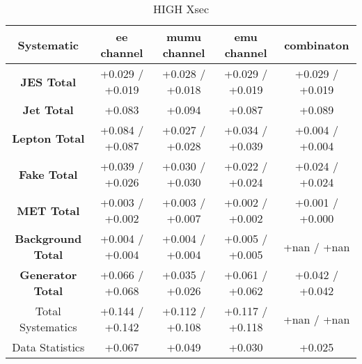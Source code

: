 \begin{table}[htbp]
\scriptsize
  \begin{center} 
  \begin{tabular}{|c|c|c|c|c|}
  \hline
 Systematic                            &  ee channel&  mumu channel&  emu channel&  combinaton\\
 \hline
\textbf{JES Total}                    &+0.029   / +0.019   & +0.028   / +0.018   & +0.029   / +0.019   & +0.029   / +0.019  \\
\textbf{Jet Total}                    &+0.083              & +0.094              & +0.087              & +0.089             \\
\textbf{Lepton Total}                 &+0.084   / +0.087   & +0.027   / +0.028   & +0.034   / +0.039   & +0.004   / +0.004  \\
\textbf{Fake Total}                   &+0.039   / +0.026   & +0.030   / +0.030   & +0.022   / +0.024   & +0.024   / +0.024  \\
\textbf{MET Total}                    &+0.003   / +0.002   & +0.003   / +0.007   & +0.002   / +0.002   & +0.001   / +0.000  \\
\textbf{Background Total}             &+0.004   / +0.004   & +0.004   / +0.004   & +0.005   / +0.005   & +nan     / +nan    \\
\textbf{Generator Total}              &+0.066   / +0.068   & +0.035   / +0.026   & +0.061   / +0.062   & +0.042   / +0.042  \\
  \hline
  \hline
Total Systematics                     &+0.144   / +0.142   & +0.112   / +0.108   & +0.117   / +0.118   & +nan     / +nan    \\
Data Statistics                       &+0.067              & +0.049              & +0.030              & +0.025             \\
  \hline
  \end{tabular}
  \end{center} 
  \label{tab:xsec_nominal_coscos_op_high}
  \caption{\coscosop HIGH Xsec}
\end{table}

